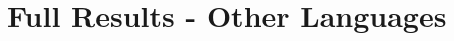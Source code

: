 \documentclass[12pt]{article}
\begin{document}
\begin{appendices}
\end{appendices}
\section{Full Results - Other Languages}

\end{document}
